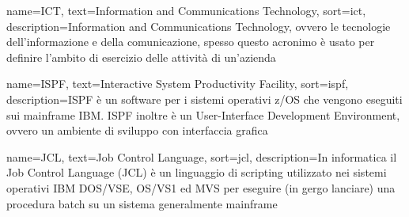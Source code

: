 
{
    name=ICT,
    text=Information and Communications Technology,
    sort=ict,
    description={Information and Communications Technology, ovvero le tecnologie dell’informazione e della comunicazione, spesso questo acronimo è usato per definire l'ambito di esercizio delle attività di un'azienda}
}

{
    name=ISPF,
    text=Interactive System Productivity Facility,
    sort=ispf,
    description={ISPF è un software per i sistemi operativi z/OS che vengono eseguiti sui mainframe IBM. ISPF inoltre è un User-Interface Development Environment, ovvero un ambiente di sviluppo con interfaccia grafica}
}




{
    name=JCL,
    text=Job Control Language,
    sort=jcl,
    description={In informatica il Job Control Language (JCL) è un linguaggio di scripting utilizzato nei sistemi operativi IBM DOS/VSE, OS/VS1 ed MVS per eseguire (in gergo lanciare) una procedura batch su un sistema generalmente mainframe}
}



